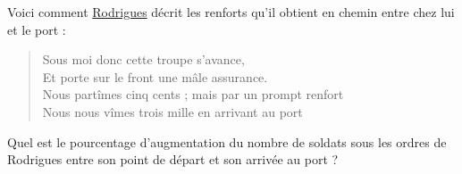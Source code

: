 
\begin{exercice}\label{exosmath-0034}

    Voici comment \href{http://fr.wikisource.org/wiki/Le_Cid}{Rodrigues} décrit les renforts qu'il obtient en chemin entre chez lui et le port :
    \begin{quote}
        \hspace{2.5cm} Sous moi donc cette troupe s’avance,\\
 Et porte sur le front une mâle assurance.\\
Nous partîmes cinq cents ; mais par un prompt renfort\\
 Nous nous vîmes trois mille en arrivant au port
        
    \end{quote}
    Quel est le pourcentage d'augmentation du nombre de soldats sous les ordres de Rodrigues entre son point de départ et son arrivée au port ?

\end{exercice}
